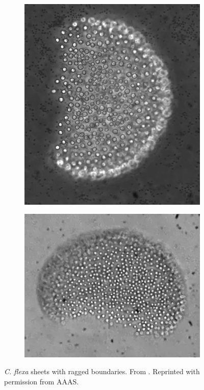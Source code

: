 \begin{figure}
	\centering
	\begin{subfigure}[b]{0.46\textwidth}
		\centering
		\includegraphics[height=\textwidth,angle=90]{edges1.png}
		\caption{}
		\label{subfig:edges1}
	\end{subfigure}
	\begin{subfigure}[b]{0.49\textwidth}
		\centering
		\includegraphics[width=\textwidth]{edges2.png}
		\caption{}
		\label{subfig:edges2}
	\end{subfigure}
	\caption[\textit{C. flexa} sheets with ragged boundaries]{\textit{C. flexa} sheets with ragged boundaries. From \citet{brunet2019}. Reprinted with permission from AAAS.}
	\label{fig:edges}
\end{figure}

